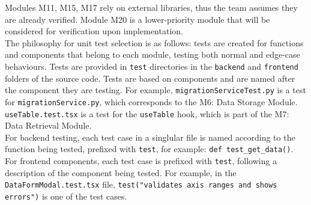 \documentclass[12pt, titlepage]{article}
\begin{document}
\noindent Modules M11, M15, M17 rely on external libraries, thus the team
assumes they are already verified. Module M20 is a lower-priority module that
will be considered for verification upon implementation. \\

\noindent The philosophy for unit test selection is as follows: tests are
created for functions and components that belong to each module, testing both
normal and edge-case behaviours. Tests are provided in \texttt{test} directories
in the \texttt{backend} and \texttt{frontend} folders of the source code. Tests
are based on components and are named after the component they are testing. For
example, \texttt{migrationServiceTest.py} is a test for
\texttt{migrationService.py}, which corresponds to the M6: Data Storage Module.
\texttt{useTable.test.tsx} is a test for the \texttt{useTable} hook, which is
part of the M7: Data Retrieval Module. \\

\noindent For backend testing, each test case in a singlular file is named
according to the function being tested, prefixed with \texttt{test}, for
example: \texttt{def test\_get\_data()}. For frontend components, each test case
is prefixed with \texttt{test}, following a description of the component being
tested. For example, in the \\ \texttt{DataFormModal.test.tsx} file,
\texttt{test("validates axis ranges and shows errors")} is one of the test
cases.

\begin{comment}
\wss{What modules are outside of the scope.  If there are modules that are
  developed by someone else, then you would say here if you aren't planning on
  verifying them.  There may also be modules that are part of your software, but
  have a lower priority for verification than others.  If this is the case,
  explain your rationale for the ranking of module importance.

\wss{Most of the verification will be through automated unit testing.  If
  appropriate specific modules can be verified by a non-testing based technique.
  That can also be documented in this section.}

\wss{Include a blurb here to explain why the subsections below cover the module.
  References to the MIS would be good.  You will want tests from a black box
  perspective and from a white box perspective.  Explain to the reader how the
  tests were selected.}
\end{comment}
\end{document}
